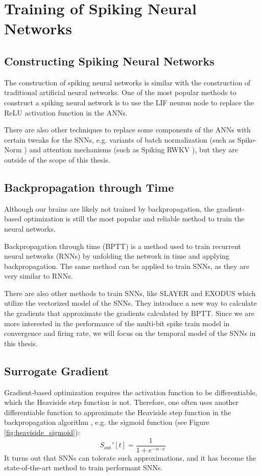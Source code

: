 \section{Training of Spiking Neural Networks}
\label{sec:snn_training}

    \subsection{Constructing Spiking Neural Networks}
    \label{subsec:snn_construct}
        The construction of spiking neural networks is similar with the construction of traditional artificial neural networks. One of the most popular methods to construct a spiking neural network is to use the LIF neuron node to replace the ReLU activation function in the ANNs. 

        There are also other techniques to replace some components of the ANNs with certain tweaks for the SNNs, e.g. variants of batch normalization (such as Spike-Norm \cite{10.3389/fnins.2019.00095}) and attention mechanisms (such as Spiking RWKV \cite{zhu2024spikegptgenerativepretrainedlanguage}), but they are outside of the scope of this thesis. 

    \subsection{Backpropagation through Time}
    \label{subsec:snn_bptt}
        Although our brains are likely not trained by backpropagation, the gradient-based optimization is still the most popular and reliable method to train the neural networks. 

        Backpropagation through time (BPTT) is a method used to train recurrent neural networks (RNNs) \cite{6302929} by unfolding the network in time and applying backpropagation. The same method can be applied to train SNNs, as they are very similar to RNNs. 

        There are also other methods to train SNNs, like SLAYER \cite{Shrestha2018} and EXODUS \cite{bauer2022exodus} which utilize the vectorized model of the SNNs. They introduce a new way to calculate the gradients that approximate the gradients calculated by BPTT. Since we are more interested in the performance of the multi-bit spike train model in convergence and firing rate, we will focus on the temporal model of the SNNs in this thesis. 

    \subsection{Surrogate Gradient}
    \label{subsec:lif_surrogate}
        Gradient-based optimization requires the activation function to be differentiable, which the Heaviside step function is not. Therefore, one often uses another differentiable function to approximate the Heaviside step function in the backpropagation algorithm \cite{8891809}, e.g. the sigmoid function (see Figure \ref{fig:heaviside_sigmoid}): 
        \begin{equation}
            S_{\text{out}}'[t] = \frac{1}{1 + e^{-\alpha \cdot x}}
        \end{equation}
        It turns out that SNNs can tolerate such approximations, and it has become the state-of-the-art method to train performant SNNs.
